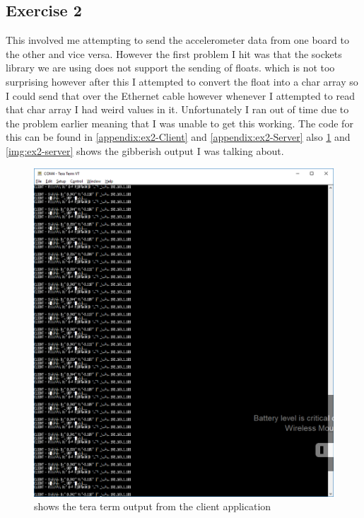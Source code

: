 \documentclass[a4paper,12pt]{scrartcl}
\begin{document}
{{			\subsection{Exercise 2}
			{
				This involved me attempting to send the accelerometer data from one board to the other and vice versa. However the first problem I hit was that the sockets library we are using does not support the sending of floats. which is not too surprising however after this I attempted to convert the float into a char array so I could send that over the Ethernet cable however whenever I attempted to read that char array I had weird values in it. Unfortunately I ran out of time due to the problem earlier meaning that I was unable to get this working. The code for this can be found in \cref{appendix:ex2-Client} and \cref{appendix:ex2-Server} also \cref{img:ex2-client} and  \cref{img:ex2-server} shows the gibberish output I was talking about.
				\begin{figure}
					\centering
					\includegraphics[width=\textwidth]{ClientAcceleratorData}
					\caption{shows the tera term output from the client application}
					\label{img:ex2-client}
				\end{figure}
				\begin{figure}

\end{figure}}}}
\end{document}
